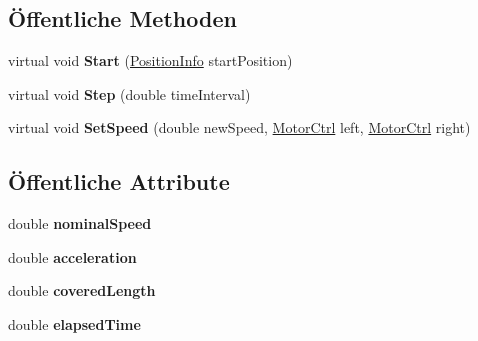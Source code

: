 \subsection*{Öffentliche Methoden}
\begin{DoxyCompactItemize}
\item 
\hypertarget{class_robot_ctrl_1_1_track_a91c0b372e1c332ae1aa18368df116633}{
virtual void {\bfseries Start} (\hyperlink{struct_robot_ctrl_1_1_position_info}{PositionInfo} startPosition)}
\label{class_robot_ctrl_1_1_track_a91c0b372e1c332ae1aa18368df116633}

\item 
\hypertarget{class_robot_ctrl_1_1_track_a82386b9a49faa6a31d9706f39238f21b}{
virtual void {\bfseries Step} (double timeInterval)}
\label{class_robot_ctrl_1_1_track_a82386b9a49faa6a31d9706f39238f21b}

\item 
\hypertarget{class_robot_ctrl_1_1_track_a9abc3ccf4bf1d9db8d461f2cb4b4b0d3}{
virtual void {\bfseries SetSpeed} (double newSpeed, \hyperlink{class_robot_ctrl_1_1_motor_ctrl}{MotorCtrl} left, \hyperlink{class_robot_ctrl_1_1_motor_ctrl}{MotorCtrl} right)}
\label{class_robot_ctrl_1_1_track_a9abc3ccf4bf1d9db8d461f2cb4b4b0d3}

\end{DoxyCompactItemize}
\subsection*{Öffentliche Attribute}
\begin{DoxyCompactItemize}
\item 
\hypertarget{class_robot_ctrl_1_1_track_a7d996b14578c6059e6868e2210e1d582}{
double {\bfseries nominalSpeed}}
\label{class_robot_ctrl_1_1_track_a7d996b14578c6059e6868e2210e1d582}

\item 
\hypertarget{class_robot_ctrl_1_1_track_abf40e28208ac9861b7f75042fcb68d20}{
double {\bfseries acceleration}}
\label{class_robot_ctrl_1_1_track_abf40e28208ac9861b7f75042fcb68d20}

\item 
\hypertarget{class_robot_ctrl_1_1_track_a590aa4c79e81feedcc5116a874d88e4d}{
double {\bfseries coveredLength}}
\label{class_robot_ctrl_1_1_track_a590aa4c79e81feedcc5116a874d88e4d}

\item 
\hypertarget{class_robot_ctrl_1_1_track_a17436774d1af50ddffc88f505728f713}{
double {\bfseries elapsedTime}}
\label{class_robot_ctrl_1_1_track_a17436774d1af50ddffc88f505728f713}

\end{DoxyCompactItemize}
